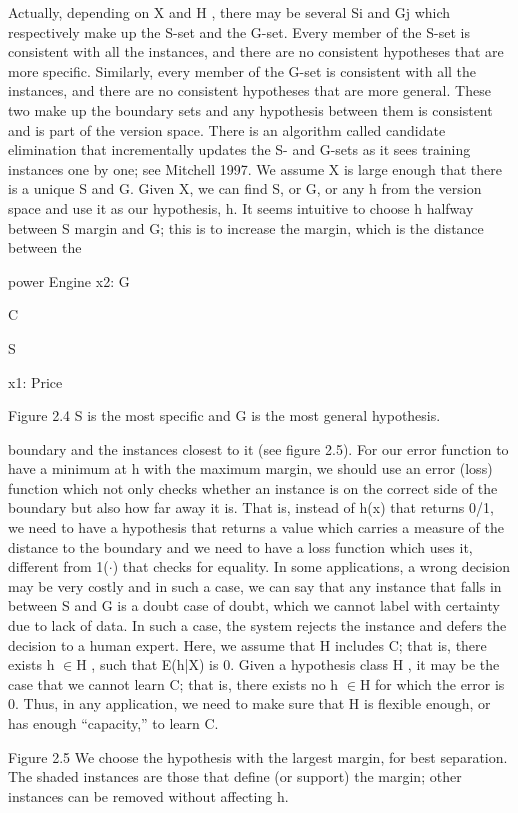 Actually, depending on X and H , there may be several Si and Gj which respectively make up the S-set and the G-set. Every member of the S-set is consistent with all the instances, and there are no consistent hypotheses that are more specific. Similarly, every member of the G-set is consistent with all the instances, and there are no consistent hypotheses that are more general. These two make up the boundary sets and any hypothesis between them is consistent and is part of the version space. There is an algorithm called candidate elimination that incrementally updates the S- and G-sets as it sees training instances one by one; see Mitchell 1997. We assume X is large enough that there is a unique S and G. Given X, we can find S, or G, or any h from the version space and use it as our hypothesis, h. It seems intuitive to choose h halfway between S margin and G; this is to increase the margin, which is the distance between the

power Engine x2: G

C

S

x1: Price

Figure 2.4 S is the most specific and G is the most general hypothesis.

boundary and the instances closest to it (see figure 2.5). For our error function to have a minimum at h with the maximum margin, we should use an error (loss) function which not only checks whether an instance is on the correct side of the boundary but also how far away it is. That is, instead of h(x) that returns 0/1, we need to have a hypothesis that returns a value which carries a measure of the distance to the boundary and we need to have a loss function which uses it, different from 1($\cdot$) that checks for equality. In some applications, a wrong decision may be very costly and in such a case, we can say that any instance that falls in between S and G is a doubt case of doubt, which we cannot label with certainty due to lack of data. In such a case, the system rejects the instance and defers the decision to a human expert. Here, we assume that H includes C; that is, there exists h $\in$H , such that E(h|X) is 0. Given a hypothesis class H , it may be the case that we cannot learn C; that is, there exists no h $\in$H for which the error is 0. Thus, in any application, we need to make sure that H is flexible enough, or has enough “capacity,” to learn C.

Figure 2.5 We choose the hypothesis with the largest margin, for best separation. The shaded instances are those that define (or support) the margin; other instances can be removed without affecting h.

